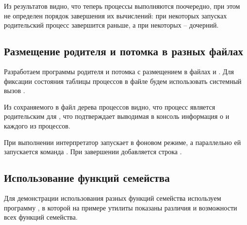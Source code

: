 Из результатов видно, что теперь процессы выполняются поочередно, при этом не определен порядок завершения их вычислений: при некоторых запусках родительский процесс завершится раньше, а при некоторых -- дочерний.



\subsection{Размещение родителя и потомка в разных файлах}
\label{sec:father-son}

Разработаем программы родителя и потомка с размещением в файлах  и . Для фиксации состояния таблицы процессов в файле будем использовать системный вызов .







Из сохраняемого в файл  дерева процессов видно, что процесс  является родительским для , что подтверждает выводимая в консоль информация о  и  каждого из процессов.



При выполнении  интерпретатор запускает  в фоновом режиме, а параллельно ей запускается команда . При завершении  добавляется строка .



\subsection{Использование функций семейства }

Для демонстрации использования разных функций семейства используем программу , в которой на примере утилиты  показаны различия и возможности всех функций семейства.



